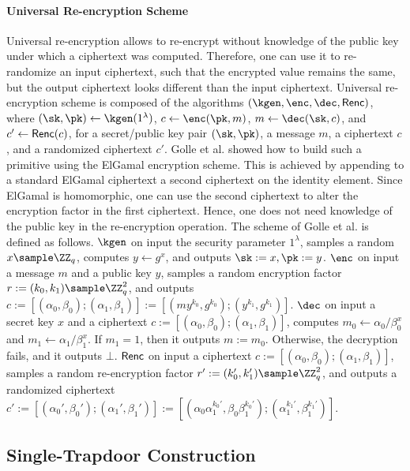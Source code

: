 \paragraph{Universal Re-encryption Scheme} Universal re-encryption allows to re-encrypt without knowledge 
of the public key under which a ciphertext was computed. Therefore, one can use it to re-randomize an input 
ciphertext, such that the encrypted value remains the same, but the output ciphertext looks different than 
the input ciphertext. Universal re-encryption scheme is composed of the algorithms $(\kgen, \enc, \dec, \renc)$, 
where $(\sk, \pk) \gets \kgen(1^\lambda)$, $c \gets \enc(\pk, m)$, $m \gets \dec(\sk, c)$, and 
$c' \gets \mathsf{Renc}(c)$, for a secret/public key pair $(\sk, \pk)$, a message $m$, a ciphertext $c$, and a 
randomized ciphertext $c'$. Golle et al. \cite{gjjs} showed how to build such a primitive using the ElGamal 
encryption scheme. This is achieved by appending to a standard ElGamal ciphertext a second ciphertext on 
the identity element. Since ElGamal is homomorphic, one can use the second ciphertext to alter the encryption 
factor in the first ciphertext. Hence, one does not need knowledge of the public key in the re-encryption 
operation. The scheme of Golle et al. is defined as follows. $\kgen$ on input the security parameter $1^\lambda$, 
samples a random $x \sample \ZZ_q$, computes $y \gets g^x$, and outputs $\sk := x, \pk := y$. $\enc$ on input 
a message $m$ and a public key $y$, samples a random encryption factor $r := (k_0, k_1) \sample \ZZ_q^2$, and 
outputs $c := [(\alpha_0,\beta_0);(\alpha_1,\beta_1)] := [(my^{k_0},g^{k_0});(y^{k_1},g^{k_1})]$. $\dec$ on 
input a secret key $x$ and a ciphertext $c := [(\alpha_0,\beta_0);(\alpha_1,\beta_1)]$, computes $m_0 \gets 
\alpha_0 / \beta_0^x$ and $m_1 \gets \alpha_1 / \beta_1^x$. If $m_1 = 1$, then it outputs $m := m_0$. Otherwise, 
the decryption fails, and it outputs $\bot$. $\mathsf{Renc}$ on input a ciphertext $c := [(\alpha_0,\beta_0); 
(\alpha_1,\beta_1)]$, samples a random re-encryption factor $r' := (k_0',k_1') \sample \ZZ_q^2$, and outputs 
a randomized ciphertext $c' := [(\alpha_0',\beta_0');(\alpha_1',\beta_1')] := [(\alpha_0\alpha_1^{k_0'},
\beta_0\beta_1^{k_0'});(\alpha_1^{k_1'},\beta_1^{k_1'})]$.

\subsection{Single-Trapdoor Construction}

